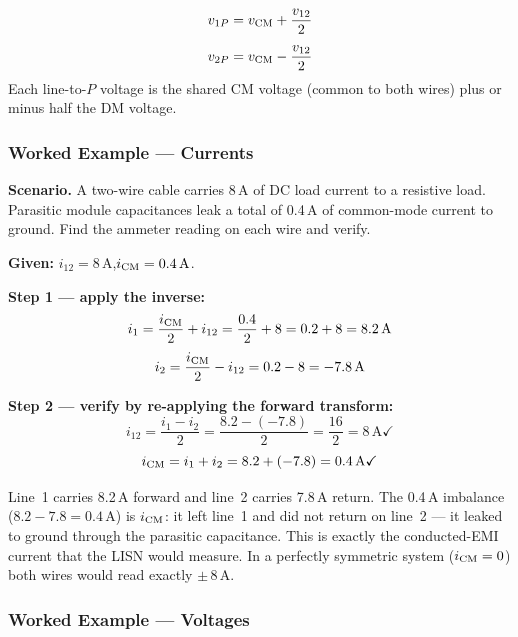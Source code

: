 \begin{eqnbox}[Recovering Line Voltages from DM and CM ($N = 2$)]
\begin{align}
    v_{1P} &= v_{\mathrm{CM}} + \frac{v_{12}}{2} \label{eq:inv_v1P} \\[4pt]
    v_{2P} &= v_{\mathrm{CM}} - \frac{v_{12}}{2} \label{eq:inv_v2P}
\end{align}
Each line-to-$P$ voltage is the shared CM voltage (common to both
wires) plus or minus half the DM voltage.
\end{eqnbox}

\subsubsection*{Worked Example — Currents}

\textbf{Scenario.}  A two-wire cable carries 8\,A of DC load current
to a resistive load.  Parasitic module capacitances leak a total of
0.4\,A of common-mode current to ground.  Find the ammeter reading
on each wire and verify.

\textbf{Given:} $i_{12} = 8\,\text{A}$,\quad $i_{\mathrm{CM}} = 0.4\,\text{A}$.

\textbf{Step 1 — apply the inverse:}
\[
    i_1 = \frac{i_{\mathrm{CM}}}{2} + i_{12}
        = \frac{0.4}{2} + 8
        = 0.2 + 8
        = 8.2\,\text{A}
\]
\[
    i_2 = \frac{i_{\mathrm{CM}}}{2} - i_{12}
        = 0.2 - 8
        = -7.8\,\text{A}
\]

\textbf{Step 2 — verify by re-applying the forward transform:}
\[
    i_{12} = \frac{i_1 - i_2}{2}
           = \frac{8.2 - (-7.8)}{2}
           = \frac{16}{2}
           = 8\,\text{A} \checkmark
\]
\[
    i_{\mathrm{CM}} = i_1 + i_2 = 8.2 + (-7.8) = 0.4\,\text{A} \checkmark
\]

\begin{physbox}
Line~1 carries 8.2\,A forward and line~2 carries 7.8\,A return.
The 0.4\,A imbalance ($8.2 - 7.8 = 0.4$\,A) is $i_{\mathrm{CM}}$: it left
line~1 and did not return on line~2 — it leaked to ground through
the parasitic capacitance.  This is exactly the conducted-EMI
current that the LISN would measure.  In a perfectly symmetric
system ($i_{\mathrm{CM}} = 0$) both wires would read exactly $\pm\,8$\,A.
\end{physbox}

\subsubsection*{Worked Example — Voltages}

